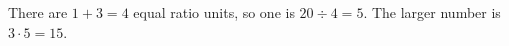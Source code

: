 There are $1+3=4$ equal ratio units, so one is $20\div4=5$. The larger number is $3\cdot5=\boxed{15}$.
